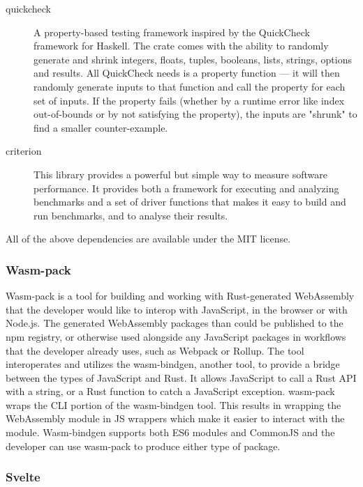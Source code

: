 \documentclass[english,engineering]{wizthesis}
\begin{document}
\begin{description}
  \item[quickcheck] A property-based testing framework inspired by the
  QuickCheck framework for Haskell. The crate comes with the ability to randomly
  generate and shrink integers, floats, tuples, booleans, lists, strings,
  options and results. All QuickCheck needs is a property function --- it will
  then randomly generate inputs to that function and call the property for each
  set of inputs. If the property fails (whether by a runtime error like index
  out-of-bounds or by not satisfying the property), the inputs are "shrunk" to
  find a smaller counter-example.
  \item[criterion] This library provides a powerful but simple way to measure
  software performance. It provides both a framework for executing and analyzing
  benchmarks and a set of driver functions that makes it easy to build and run
  benchmarks, and to analyse their results.
\end{description}
All of the above dependencies are available under the MIT license.

\subsubsection*{Wasm-pack}

Wasm-pack is a tool for building and working with Rust-generated WebAssembly
that the developer would like to interop with JavaScript, in the browser or with
Node.js. The generated WebAssembly packages than could be published to the npm
registry, or otherwise used alongside any JavaScript packages in workflows that
the developer already uses, such as Webpack or Rollup. The tool interoperates
and utilizes the wasm-bindgen, another tool, to provide a bridge between the
types of JavaScript and Rust. It allows JavaScript to call a Rust API with a
string, or a Rust function to catch a JavaScript exception. wasm-pack wraps the
CLI portion of the wasm-bindgen tool. This results in wrapping the WebAssembly
module in JS wrappers which make it easier to interact with the module.
Wasm-bindgen supports both ES6 modules and CommonJS and the developer can use
wasm-pack to produce either type of package.

\subsubsection*{Svelte}
\end{document}
